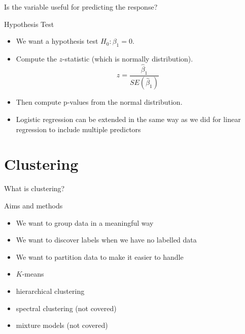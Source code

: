 \documentclass{bredelebeamer}
\begin{document}
\begin{frame}{Is the variable useful for predicting the response?}

\begin{exampleblock}{Hypothesis Test}

\begin{itemize}
	\item We want a hypothesis test $H_0: \beta_1 = 0$.
	\item Compute the $z$-statistic (which is normally distribution).
	\begin{equation}
	z = \frac{\hat{\beta}_1}{SE(\hat{\beta}_1)}
	\end{equation}
	\item Then compute p-values from the normal distribution.
	\item Logistic regression can be extended in the same way as we did for linear regression to include multiple predictors
\end{itemize}

\end{exampleblock}

\end{frame}

\section{Clustering}

\begin{frame}{What is clustering?}
\begin{exampleblock}{Aims and methods}
	
	\begin{itemize}
		\item We want to group data in a meaningful way
		\item We want to discover labels when we have no labelled data
		\item We want to partition data to make it easier to handle
		\item $K$-means
		\item hierarchical clustering
		\item spectral clustering (not covered)
		\item mixture models (not covered)
	\end{itemize}
\end{exampleblock}
\end{frame}
\end{document}

